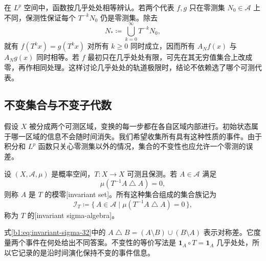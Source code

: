 \ProseParagraphBreak

在 \(L^p\) 空间中，函数按几乎处处相等辨认。若两个代表 \(f,g\) 只在零测集 \(N_0\in\mathcal A\) 上不同，保测性保证每个 \(T^{-k}N_0\) 仍是零测集。除去
\[
 N_*\coloneqq\bigcup_{k=0}^{\infty}T^{-k}N_0,
\]
就有 \(f(T^kx)=g(T^kx)\) 对所有 \(k\geq0\) 同时成立，因而所有 \(A_Nf(x)\) 与 \(A_Ng(x)\) 同时相等。若 \(f\) 最初只在几乎处处有限，可先在其无穷值集合上改成零，再作相同处理。这样讨论几乎处处的轨道极限时，结论不依赖选了哪个可测代表。

\subsection{不变集合与不变子代数}
\label{b1:subsec:320102}

假设 \(X\) 被分成两个可测区域，变换的每一步都在各自区域内部进行。初始状态属于哪一区域的信息不会随时间消失。我们希望收集所有具有这种性质的事件。由于积分和 \(L^p\) 函数只关心零测集以外的情况，集合的不变性也应允许一个零测的误差。

\begin{definition}\label{b1:def:invariant-sigma-32}
设 \((X,\mathcal A,\mu)\) 是概率空间，\(T\colon X\rightarrow X\) 可测且保测。若 \(A\in\mathcal A\) 满足
\[
 \mu(T^{-1}A\mathbin{\triangle}A)=0,
\]
则称 \(A\) 是 \(T\) 的模零[invariant set]。所有这种集合组成的集合族记为
\begin{equation}\label{b1:eq:invariant-sigma-32}
 \mathcal I_T\coloneqq
 \{\,A\in\mathcal A\mid\mu(T^{-1}A\mathbin{\triangle}A)=0\,\},
\end{equation}
称为 \(T\) 的[invariant sigma-algebra]。
\end{definition}

式\eqref{b1:eq:invariant-sigma-32}中的 \(A\mathbin{\triangle}B=(A\setminus B)\cup(B\setminus A)\) 表示对称差。它度量两个事件在何处给出不同答案。不变性的等价写法是 \(\mathbf1_A\circ T=\mathbf1_A\) 几乎处处，所以它记录的是沿时间演化保持不变的事件信息。

